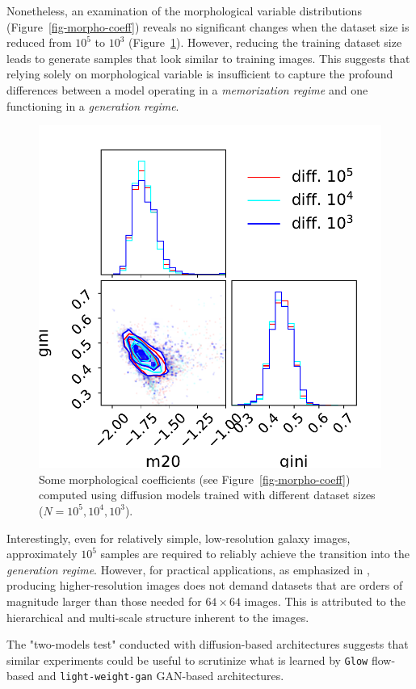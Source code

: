 \documentclass[fleqn,usenatbib]{mnras}
\begin{document}
Nonetheless, an examination of the morphological variable distributions (Figure~\ref{fig-morpho-coeff}) reveals no significant changes when the dataset size is reduced from $10^5$ to $10^3$ (Figure~\ref{fig-morpho-coeff-diff-comparison}). However, reducing the training dataset size leads to generate samples that look similar to training images. This suggests that relying solely on morphological variable is insufficient to capture the profound differences between a model operating in a \textit{memorization regime} and one functioning in a \textit{generation regime}.
%
\begin{figure}
    \centering
	\includegraphics[width=0.7\linewidth]{fig-gini-m20-diff-compare_0.pdf}
	\caption{Some morphological coefficients (see Figure~\ref{fig-morpho-coeff}) computed using diffusion models trained with different dataset sizes ($N=10^5, 10^4, 10^3$).}
	\label{fig-morpho-coeff-diff-comparison}
\end{figure}

Interestingly, even for relatively simple, low-resolution galaxy images, approximately $10^5$ samples are required to reliably achieve the transition into the \textit{generation regime}. However, for practical applications, as emphasized in \cite{kadkhodaie2024generalization}, producing higher-resolution images does not demand datasets that are orders of magnitude larger than those needed for $64 \times 64$ images. This is attributed to the hierarchical and multi-scale structure inherent to the images.

The "two-models test" conducted with diffusion-based architectures suggests that similar experiments could be useful to scrutinize what is learned by \texttt{Glow} flow-based and \texttt{light-weight-gan} GAN-based architectures.
%
\end{document}
